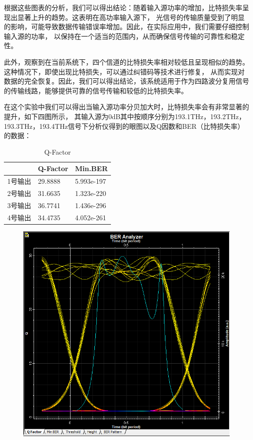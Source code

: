 \documentclass[12pt, a4paper, oneside]{article}
\begin{document}
\begin{spacing}{2.0}
根据这些图表的分析，我们可以得出结论：随着输入源功率的增加，比特损失率呈现出显著上升的趋势。这表明在高功率输入源下，
光信号的传输质量受到了明显的影响，可能导致数据传输错误率增加。因此，在实际应用中，我们需要仔细控制输入源的功率，
以保持在一个适当的范围内，从而确保信号传输的可靠性和稳定性。

此外，观察到在当前系统下，四个信道的比特损失率相对较低且呈现相似的趋势。这种情况下，即使出现比特损失，可以通过纠错码等技术进行修复，
从而实现对数据的完全恢复。因此，我们可以得出结论，该系统适用于作为四路波分复用信号的传输线路，能够提供可靠的信号传输和较低的比特损失率。

在这个实验中我们可以得出当输入源功率分贝加大时，比特损失率会有非常显著的提升，如下四图所示，
其输入源为0dB其中按顺序分别为193.1THz，193.2THz，193.3THz，193.4THz信号下分析仪得到的眼图以及Q因数和BER（比特损失率）的数据：
\clearpage
\begin{table}[H]
  \centering
  \caption{Q-Factor}
  \begin{tabular}{|l|l|l|} 
  \hline
    & Q-Factor & Min.BER    \\ 
  \hline
  1号输出 & 29.8888  & 5.993e-197  \\ 
  \hline
  2号输出 & 31.6635  & 1.323e-220  \\ 
  \hline
  3号输出 & 36.7741   & 1.436e-296  \\ 
  \hline
  4号输出 & 34.4735  & 4.052e-261  \\
  \hline
  \end{tabular}
  \end{table}
\begin{figure}[H]
    \begin{minipage}[t]{0.5\linewidth}
        \centering
        \includegraphics[scale=0.5]{sweep2Q1.png}

\end{minipage}
\end{figure}
\end{spacing}
\end{document}
